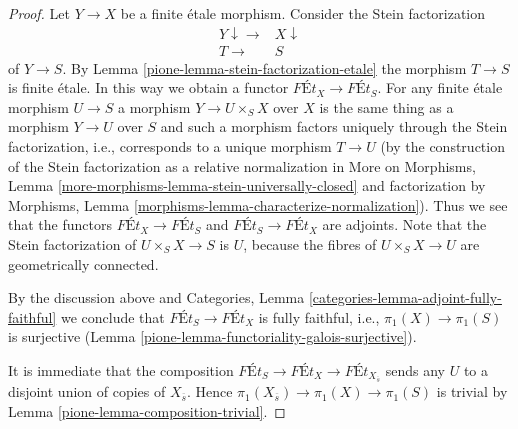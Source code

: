 \begin{proof}

Let $Y \to X$ be a finite \'etale morphism. Consider the Stein factorization
$$
\begin{array}{cc}Y \downarrow\longrightarrow & X \downarrow \\ T \longrightarrow & S\end{array}
$$
of $Y \to S$. By Lemma \ref{pione-lemma-stein-factorization-etale}
the morphism $T \to S$ is finite \'etale. In this way we obtain
a functor $\textit{F\'Et}_X \to \textit{F\'Et}_S$.
For any finite \'etale morphism $U \to S$ a morphism
$Y \to U \times_S X$ over $X$ is the same thing as a morphism
$Y \to U$ over $S$ and such a morphism factors uniquely through
the Stein factorization, i.e., corresponds to a unique
morphism $T \to U$
(by the construction of the Stein factorization as a relative
normalization in More on Morphisms, Lemma
\ref{more-morphisms-lemma-stein-universally-closed}
and factorization by
Morphisms, Lemma \ref{morphisms-lemma-characterize-normalization}).
Thus we see that the functors
$\textit{F\'Et}_X \to \textit{F\'Et}_S$ and
$\textit{F\'Et}_S \to \textit{F\'Et}_X$ are adjoints.
Note that the Stein factorization of $U \times_S X \to S$ is
$U$, because the fibres of $U \times_S X \to U$ are geometrically connected.

\medskip\noindent
By the discussion above and
Categories, Lemma \ref{categories-lemma-adjoint-fully-faithful}
we conclude that
$\textit{F\'Et}_S \to \textit{F\'Et}_X$
is fully faithful, i.e., $\pi_1(X) \to \pi_1(S)$ is surjective
(Lemma \ref{pione-lemma-functoriality-galois-surjective}).

\medskip\noindent
It is immediate that the composition
$\textit{F\'Et}_S \to \textit{F\'Et}_X \to \textit{F\'Et}_{X_{\overline{s}}}$
sends any $U$ to a disjoint union of copies of $X_{\overline{s}}$.
Hence $\pi_1(X_{\overline{s}}) \to \pi_1(X) \to \pi_1(S)$ is trivial
by Lemma \ref{pione-lemma-composition-trivial}.


\end{proof}
